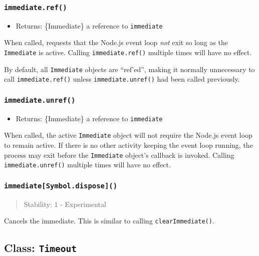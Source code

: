 \subsubsection{\texorpdfstring{\texttt{immediate.ref()}}{immediate.ref()}}\label{immediate.ref}

\begin{itemize}
\tightlist
\item
  Returns: \{Immediate\} a reference to \texttt{immediate}
\end{itemize}

When called, requests that the Node.js event loop \emph{not} exit so
long as the \texttt{Immediate} is active. Calling
\texttt{immediate.ref()} multiple times will have no effect.

By default, all \texttt{Immediate} objects are ``ref'ed'', making it
normally unnecessary to call \texttt{immediate.ref()} unless
\texttt{immediate.unref()} had been called previously.

\subsubsection{\texorpdfstring{\texttt{immediate.unref()}}{immediate.unref()}}\label{immediate.unref}

\begin{itemize}
\tightlist
\item
  Returns: \{Immediate\} a reference to \texttt{immediate}
\end{itemize}

When called, the active \texttt{Immediate} object will not require the
Node.js event loop to remain active. If there is no other activity
keeping the event loop running, the process may exit before the
\texttt{Immediate} object's callback is invoked. Calling
\texttt{immediate.unref()} multiple times will have no effect.

\subsubsection{\texorpdfstring{\texttt{immediate{[}Symbol.dispose{]}()}}{immediate{[}Symbol.dispose{]}()}}\label{immediatesymbol.dispose}

\begin{quote}
Stability: 1 - Experimental
\end{quote}

Cancels the immediate. This is similar to calling
\texttt{clearImmediate()}.

\subsection{\texorpdfstring{Class:
\texttt{Timeout}}{Class: Timeout}}\label{class-timeout}


